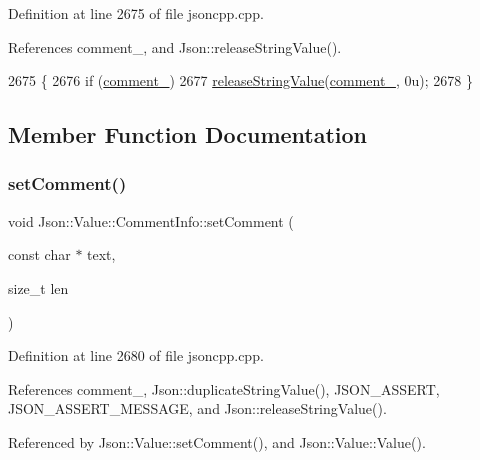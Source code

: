 Definition at line 2675 of file jsoncpp.\+cpp.



References comment\+\_\+, and Json\+::release\+String\+Value().


\begin{DoxyCode}
2675                                \{
2676   \textcolor{keywordflow}{if} (\hyperlink{struct_json_1_1_value_1_1_comment_info_a020f19c7098bab8ec8fec14cd1a5afb9}{comment\_})
2677     \hyperlink{namespace_json_a3e0d81d514d0e8bddf33b08074214abd}{releaseStringValue}(\hyperlink{struct_json_1_1_value_1_1_comment_info_a020f19c7098bab8ec8fec14cd1a5afb9}{comment\_}, 0u);
2678 \}
\end{DoxyCode}


\subsection{Member Function Documentation}
\mbox{\label{struct_json_1_1_value_1_1_comment_info_a4d01c2cd8c07995969c5d636dfd4fa8c}} 
\subsubsection{\texorpdfstring{set\+Comment()}{setComment()}}
{\footnotesize\ttfamily void Json\+::\+Value\+::\+Comment\+Info\+::set\+Comment (\begin{DoxyParamCaption}\item[{const char $\ast$}]{text,  }\item[{size\+\_\+t}]{len }\end{DoxyParamCaption})}



Definition at line 2680 of file jsoncpp.\+cpp.



References comment\+\_\+, Json\+::duplicate\+String\+Value(), J\+S\+O\+N\+\_\+\+A\+S\+S\+E\+RT, J\+S\+O\+N\+\_\+\+A\+S\+S\+E\+R\+T\+\_\+\+M\+E\+S\+S\+A\+GE, and Json\+::release\+String\+Value().



Referenced by Json\+::\+Value\+::set\+Comment(), and Json\+::\+Value\+::\+Value().


